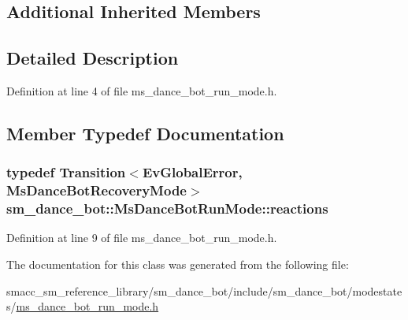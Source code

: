 \subsection*{Additional Inherited Members}


\subsection{Detailed Description}


Definition at line 4 of file ms\+\_\+dance\+\_\+bot\+\_\+run\+\_\+mode.\+h.



\subsection{Member Typedef Documentation}
\subsubsection[{\texorpdfstring{reactions}{reactions}}]{\setlength{\rightskip}{0pt plus 5cm}typedef Transition$<${\bf Ev\+Global\+Error}, {\bf Ms\+Dance\+Bot\+Recovery\+Mode}$>$ {\bf sm\+\_\+dance\+\_\+bot\+::\+Ms\+Dance\+Bot\+Run\+Mode\+::reactions}}\hypertarget{classsm__dance__bot_1_1MsDanceBotRunMode_a719e14916aaff2ff6482b666f55027b7}{}\label{classsm__dance__bot_1_1MsDanceBotRunMode_a719e14916aaff2ff6482b666f55027b7}


Definition at line 9 of file ms\+\_\+dance\+\_\+bot\+\_\+run\+\_\+mode.\+h.



The documentation for this class was generated from the following file\+:\begin{DoxyCompactItemize}
\item 
smacc\+\_\+sm\+\_\+reference\+\_\+library/sm\+\_\+dance\+\_\+bot/include/sm\+\_\+dance\+\_\+bot/modestates/\hyperlink{ms__dance__bot__run__mode_8h}{ms\+\_\+dance\+\_\+bot\+\_\+run\+\_\+mode.\+h}\end{DoxyCompactItemize}
